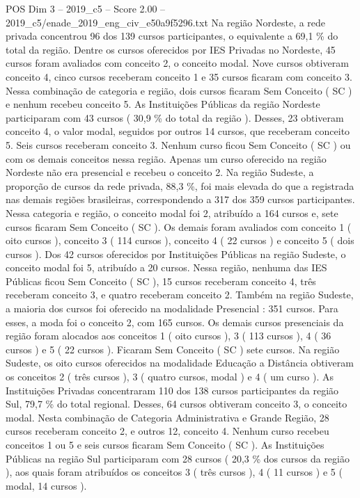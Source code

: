 \begin{textsample}{POS Dim 3 – 2019\_c5 – Score 2.00 – 2019\_c5/enade\_2019\_eng\_civ\_e50a9f5296.txt}
Na região Nordeste, a rede privada concentrou 96 dos 139 cursos participantes, o equivalente a 69,1 \% do total da região.
Dentre os cursos oferecidos por IES Privadas no Nordeste, 45 cursos foram avaliados com conceito 2, o conceito modal.
Nove cursos obtiveram conceito 4, cinco cursos receberam conceito 1 e 35 cursos ficaram com conceito 3.
Nessa combinação de categoria e região, dois cursos ficaram Sem Conceito ( SC ) e nenhum recebeu conceito 5.
As Instituições Públicas da região Nordeste participaram com 43 cursos ( 30,9 \% do total da região ).
Desses, 23 obtiveram conceito 4, o valor modal, seguidos por outros 14 cursos, que receberam conceito 5.
Seis cursos receberam conceito 3.
Nenhum curso ficou Sem Conceito ( SC ) ou com os demais conceitos nessa região.
Apenas um curso oferecido na região Nordeste não era presencial e recebeu o conceito 2.
Na região Sudeste, a proporção de cursos da rede privada, 88,3 \%, foi mais elevada do que a registrada nas demais regiões brasileiras, correspondendo a 317 dos 359 cursos participantes.
Nessa categoria e região, o conceito modal foi 2, atribuído a 164 cursos e, sete cursos ficaram Sem Conceito ( SC ).
Os demais foram avaliados com conceito 1 ( oito cursos ), conceito 3 ( 114 cursos ), conceito 4 ( 22 cursos ) e conceito 5 ( dois cursos ).
Dos 42 cursos oferecidos por Instituições Públicas na região Sudeste, o conceito modal foi 5, atribuído a 20 cursos.
Nessa região, nenhuma das IES Públicas ficou Sem Conceito ( SC ), 15 cursos receberam conceito 4, três receberam conceito 3, e quatro receberam conceito 2.
Também na região Sudeste, a maioria dos cursos foi oferecido na modalidade Presencial : 351 cursos.
Para esses, a moda foi o conceito 2, com 165 cursos.
Os demais cursos presenciais da região foram alocados aos conceitos 1 ( oito cursos ), 3 ( 113 cursos ), 4 ( 36 cursos ) e 5 ( 22 cursos ).
Ficaram Sem Conceito ( SC ) sete cursos.
Na região Sudeste, os oito cursos oferecidos na modalidade Educação a Distância obtiveram os conceitos 2 ( três cursos ), 3 ( quatro cursos, modal ) e 4 ( um curso ).
As Instituições Privadas concentraram 110 dos 138 cursos participantes da região Sul, 79,7 \% do total regional.
Desses, 64 cursos obtiveram conceito 3, o conceito modal.
Nesta combinação de Categoria Administrativa e Grande Região, 28 cursos receberam conceito 2, e outros 12, conceito 4.
Nenhum curso recebeu conceitos 1 ou 5 e seis cursos ficaram Sem Conceito ( SC ).
As Instituições Públicas na região Sul participaram com 28 cursos ( 20,3 \% dos cursos da região ), aos quais foram atribuídos os conceitos 3 ( três cursos ), 4 ( 11 cursos ) e 5 ( modal, 14 cursos ).

\end{textsample}
